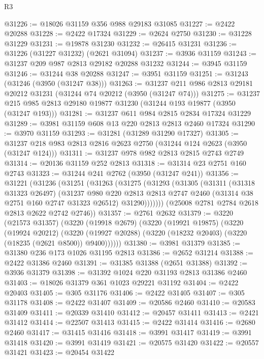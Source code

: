 \begin{lexlean}{R3}
\begin{coremodule}
@31226 := @18026 @31159 @356 @988 @29183 @31085
@31227 := @2422 @20288
@31228 := @2422 @17324
@31229 := @2624 @2750
@31230 := @31228 @31229
@31231 := @19878 @31230
@31232 := @26415 @31231
@31236 := @31226 (@31227 @31232) (@2621 @31094)
@31237 := @3936 @31159
@31243 := @31237 @209 @987 @2813 @29182 @20288 @31232
@31244 := @3945 @31159
@31246 := @31244 @38 @20288
@31247 := @3951 @31159
@31251 := @31243 (@31246 (@3950 (@31247 @38)))
@31263 := @31237 @211 @986 @2813 @29181 @20212 @31231 (@31244 @74 @20212 (@3950 (@31247 @74)))
@31275 := @31237 @215 @985 @2813 @29180 @19877 @31230 (@31244 @193 @19877 (@3950 (@31247 @193)))
@31281 := @31237 @611 @984 @2815 @2834 @17324 @31229
@31289 := @3981 @31159 @608 @13 @220 @2813 @2813 @2460 @17324
@31290 := @3970 @31159
@31293 := @31281 (@31289 @31290 @17327)
@31305 := @31237 @218 @983 @2813 @2816 @2623 @2750 (@31244 @124 @2623 (@3950 (@31247 @124)))
@31311 := @31237 @978 @982 @2813 @2815 @2743 @2749
@31314 := @20136 @31159 @252 @2813
@31318 := @31314 @23 @2751 @160 @2743
@31323 := @31244 @241 @2762 (@3950 (@31247 @241))
@31356 := @31221
    (@31236
      (@31251
        (@31263
          (@31275
            (@31293
              (@31305
                (@31311
                  (@31318 @31323 @26497)
                  (@31237
                    @980
                    @220
                    @2813
                    @2813
                    @2747
                    @2460
                    (@31314 @38 @2751 @160 @2747 @31323 @26512)
                    @31290)))))))
      (@25008 @2781 @2784 @2618 @2813 @2622 @2742 @2746))
@31357 := @2761 @2632
@31379 := @3220
    (@21573 @31357)
    (@3220
      (@19918 @2679)
      (@3220
        (@19921 @19875)
        (@3220
          (@19924 @20212)
          (@3220 (@19927 @20288) (@3220 (@18232 @20403) (@3220 (@18235 (@2621 @8500)) @9400))))))
@31380 := @3981 @31379
@31385 := @31380 @236 @173 @1026 @31195 @2813
@31386 := @2652 @31214
@31388 := @2422 @31386 @2460
@31391 := @31385 @31388 (@2651 @31388)
@31392 := @3936 @31379
@31398 := @31392 @1024 @220 @31193 @2813 @31386 @2460
@31403 := @18026 @31379 @361 @1023 @29221 @31192
@31404 := @2422 @20403
@31405 := @305 @31176
@31406 := @2422 @31405
@31407 := @305 @31178
@31408 := @2422 @31407
@31409 := @20586 @2460
@31410 := @20583 @31409
@31411 := @20339 @31410
@31412 := @20457 @31411
@31413 := @2421 @31412
@31414 := @22507 @31413
@31415 := @2422 @31414
@31416 := @2680 @2460
@31417 := @31415 @31416
@31418 := @3991 @31417
@31419 := @3991 @31418
@31420 := @3991 @31419
@31421 := @20575 @31420
@31422 := @20557 @31421
@31423 := @20454 @31422

\end{coremodule}
\end{lexlean}
